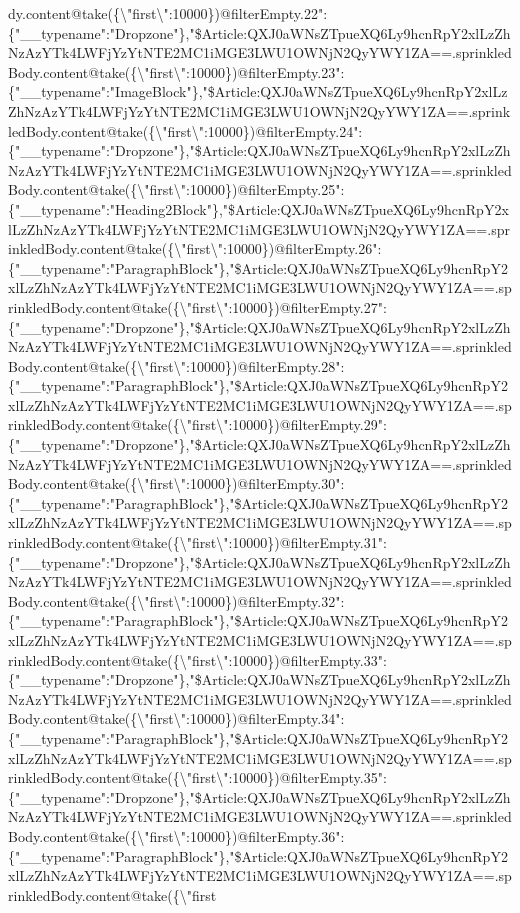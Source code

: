 dy.content@take(\{\textbackslash{}"first\textbackslash{}":10000\})@filterEmpty.22":\{"\_\_typename":"Dropzone"\},"\$Article:QXJ0aWNsZTpueXQ6Ly9hcnRpY2xlLzZhNzAzYTk4LWFjYzYtNTE2MC1iMGE3LWU1OWNjN2QyYWY1ZA==.sprinkledBody.content@take(\{\textbackslash{}"first\textbackslash{}":10000\})@filterEmpty.23":\{"\_\_typename":"ImageBlock"\},"\$Article:QXJ0aWNsZTpueXQ6Ly9hcnRpY2xlLzZhNzAzYTk4LWFjYzYtNTE2MC1iMGE3LWU1OWNjN2QyYWY1ZA==.sprinkledBody.content@take(\{\textbackslash{}"first\textbackslash{}":10000\})@filterEmpty.24":\{"\_\_typename":"Dropzone"\},"\$Article:QXJ0aWNsZTpueXQ6Ly9hcnRpY2xlLzZhNzAzYTk4LWFjYzYtNTE2MC1iMGE3LWU1OWNjN2QyYWY1ZA==.sprinkledBody.content@take(\{\textbackslash{}"first\textbackslash{}":10000\})@filterEmpty.25":\{"\_\_typename":"Heading2Block"\},"\$Article:QXJ0aWNsZTpueXQ6Ly9hcnRpY2xlLzZhNzAzYTk4LWFjYzYtNTE2MC1iMGE3LWU1OWNjN2QyYWY1ZA==.sprinkledBody.content@take(\{\textbackslash{}"first\textbackslash{}":10000\})@filterEmpty.26":\{"\_\_typename":"ParagraphBlock"\},"\$Article:QXJ0aWNsZTpueXQ6Ly9hcnRpY2xlLzZhNzAzYTk4LWFjYzYtNTE2MC1iMGE3LWU1OWNjN2QyYWY1ZA==.sprinkledBody.content@take(\{\textbackslash{}"first\textbackslash{}":10000\})@filterEmpty.27":\{"\_\_typename":"Dropzone"\},"\$Article:QXJ0aWNsZTpueXQ6Ly9hcnRpY2xlLzZhNzAzYTk4LWFjYzYtNTE2MC1iMGE3LWU1OWNjN2QyYWY1ZA==.sprinkledBody.content@take(\{\textbackslash{}"first\textbackslash{}":10000\})@filterEmpty.28":\{"\_\_typename":"ParagraphBlock"\},"\$Article:QXJ0aWNsZTpueXQ6Ly9hcnRpY2xlLzZhNzAzYTk4LWFjYzYtNTE2MC1iMGE3LWU1OWNjN2QyYWY1ZA==.sprinkledBody.content@take(\{\textbackslash{}"first\textbackslash{}":10000\})@filterEmpty.29":\{"\_\_typename":"Dropzone"\},"\$Article:QXJ0aWNsZTpueXQ6Ly9hcnRpY2xlLzZhNzAzYTk4LWFjYzYtNTE2MC1iMGE3LWU1OWNjN2QyYWY1ZA==.sprinkledBody.content@take(\{\textbackslash{}"first\textbackslash{}":10000\})@filterEmpty.30":\{"\_\_typename":"ParagraphBlock"\},"\$Article:QXJ0aWNsZTpueXQ6Ly9hcnRpY2xlLzZhNzAzYTk4LWFjYzYtNTE2MC1iMGE3LWU1OWNjN2QyYWY1ZA==.sprinkledBody.content@take(\{\textbackslash{}"first\textbackslash{}":10000\})@filterEmpty.31":\{"\_\_typename":"Dropzone"\},"\$Article:QXJ0aWNsZTpueXQ6Ly9hcnRpY2xlLzZhNzAzYTk4LWFjYzYtNTE2MC1iMGE3LWU1OWNjN2QyYWY1ZA==.sprinkledBody.content@take(\{\textbackslash{}"first\textbackslash{}":10000\})@filterEmpty.32":\{"\_\_typename":"ParagraphBlock"\},"\$Article:QXJ0aWNsZTpueXQ6Ly9hcnRpY2xlLzZhNzAzYTk4LWFjYzYtNTE2MC1iMGE3LWU1OWNjN2QyYWY1ZA==.sprinkledBody.content@take(\{\textbackslash{}"first\textbackslash{}":10000\})@filterEmpty.33":\{"\_\_typename":"Dropzone"\},"\$Article:QXJ0aWNsZTpueXQ6Ly9hcnRpY2xlLzZhNzAzYTk4LWFjYzYtNTE2MC1iMGE3LWU1OWNjN2QyYWY1ZA==.sprinkledBody.content@take(\{\textbackslash{}"first\textbackslash{}":10000\})@filterEmpty.34":\{"\_\_typename":"ParagraphBlock"\},"\$Article:QXJ0aWNsZTpueXQ6Ly9hcnRpY2xlLzZhNzAzYTk4LWFjYzYtNTE2MC1iMGE3LWU1OWNjN2QyYWY1ZA==.sprinkledBody.content@take(\{\textbackslash{}"first\textbackslash{}":10000\})@filterEmpty.35":\{"\_\_typename":"Dropzone"\},"\$Article:QXJ0aWNsZTpueXQ6Ly9hcnRpY2xlLzZhNzAzYTk4LWFjYzYtNTE2MC1iMGE3LWU1OWNjN2QyYWY1ZA==.sprinkledBody.content@take(\{\textbackslash{}"first\textbackslash{}":10000\})@filterEmpty.36":\{"\_\_typename":"ParagraphBlock"\},"\$Article:QXJ0aWNsZTpueXQ6Ly9hcnRpY2xlLzZhNzAzYTk4LWFjYzYtNTE2MC1iMGE3LWU1OWNjN2QyYWY1ZA==.sprinkledBody.content@take(\{\textbackslash{}"first\textbackslas